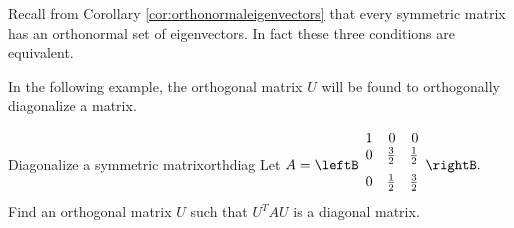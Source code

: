 Recall from Corollary \ref{cor:orthonormaleigenvectors} that every symmetric matrix has an orthonormal set of eigenvectors. In fact these three conditions are equivalent. 

In the following example, the orthogonal
matrix $U$ will be found to orthogonally diagonalize a matrix. 

\begin{example}{Diagonalize a symmetric matrix}{orthdiag}
Let $A=\leftB
\begin{array}{rrr}
1 & 0 & 0 \\
0 &
\vspace{0.05in}\frac{3}{2} & \vspace{0.05in}\frac{1}{2} \\
0 & \vspace{0.05in}\frac{1}{2} & \vspace{0.05in}\frac{3}{2}
\end{array}
\rightB .$ Find an orthogonal matrix $U$ such that $U^{T}AU$ is a diagonal
matrix.
\end{example}

